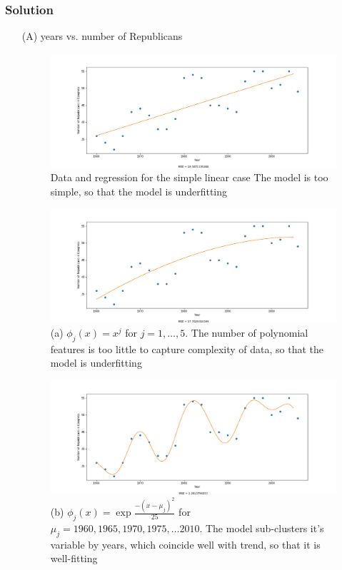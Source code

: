 \documentclass[submit]{harvardml}
\begin{document}
\subsubsection*{Solution}
\begin{itemize}
\item[(A)]years vs. number of Republicans
\begin{figure}[h]
\centering
\includegraphics[width=\textwidth]{data/2_simplest}
\caption{Data and regression for the simple linear case The model is too simple, so that the model is underfitting}
\label{fig:2_simplest}
\end{figure}

\newpage
\begin{figure}[h]
\centering
\includegraphics[width=\textwidth]{data/2_a}
\caption{(a) $\phi_j(x) = x^j$ for $j=1, \ldots, 5$. The number of polynomial features is too little to capture complexity of data, so that the model is underfitting}
\label{fig:2_a}
\end{figure}

\begin{figure}[h]
\centering
\includegraphics[width=\textwidth]{data/2_b}
\caption{(b) $\phi_j(x) = \exp{\frac{-(x-\mu_j)^2}{25}}$ for $\mu_j=1960, 1965, 1970, 1975, \ldots 2010$. The model sub-clusters it's variable by years, which coincide well with trend, so that it is well-fitting}
\label{fig:2_b}
\end{figure}


\end{itemize}
\end{document}
